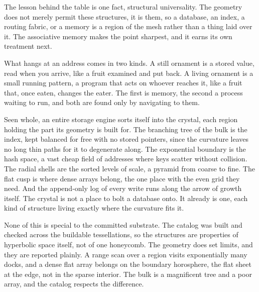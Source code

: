 The lesson behind the table is one fact, structural universality. The geometry does not merely permit these structures, it is them, so a database, an index, a routing fabric, or a memory is a region of the mesh rather than a thing laid over it. The associative memory makes the point sharpest, and it earns its own treatment next.

What hangs at an address comes in two kinds. A still ornament is a stored value, read when you arrive, like a fruit examined and put back. A living ornament is a small running pattern, a program that acts on whoever reaches it, like a fruit that, once eaten, changes the eater. The first is memory, the second a process waiting to run, and both are found only by navigating to them.

Seen whole, an entire storage engine sorts itself into the crystal, each region holding the part its geometry is built for. The branching tree of the bulk is the index, kept balanced for free with no stored pointers, since the curvature leaves no long thin paths for it to degenerate along. The exponential boundary is the hash space, a vast cheap field of addresses where keys scatter without collision. The radial shells are the sorted levels of scale, a pyramid from coarse to fine. The flat cusp is where dense arrays belong, the one place with the even grid they need. And the append-only log of every write runs along the arrow of growth itself. The crystal is not a place to bolt a database onto. It already is one, each kind of structure living exactly where the curvature fits it.

None of this is special to the committed substrate. The catalog was built and checked across the buildable tessellations, so the structures are properties of hyperbolic space itself, not of one honeycomb. The geometry does set limits, and they are reported plainly. A range scan over a region visits exponentially many docks, and a dense flat array belongs on the boundary horosphere, the flat sheet at the edge, not in the sparse interior. The bulk is a magnificent tree and a poor array, and the catalog respects the difference.
